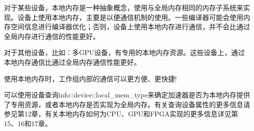 对于某些设备，本地内存是一种抽象概念，使用与全局内存相同的内存子系统来实现。设备上使用本地内存，主要是以便通信机制的使用。一些编译器可能会使用内存空间信息进行编译器优化；否则，设备上使用本地内存进行通信，并不会比通过全局内存进行通信的性能更好。\par

对于其他设备，比如：多GPU设备，有专用的本地内存资源。这些设备上，通过本地内存通信比通过全局内存通信性能更好。\par

\begin{tcolorbox}[colback=red!5!white,colframe=red!75!black]
使用本地内存时，工作组内部的通信可以更方便、更快捷!
\end{tcolorbox}

可以使用设备查询info::device::local\_mem\_type来确定加速器是否为本地内存提供了专用资源，或者本地内存是否实现为全局内存。有关查询设备属性的更多信息请参见第12章，有关本地内存如何为CPU、GPU和FPGA实现的更多信息详见第15、16和17章。\par





































